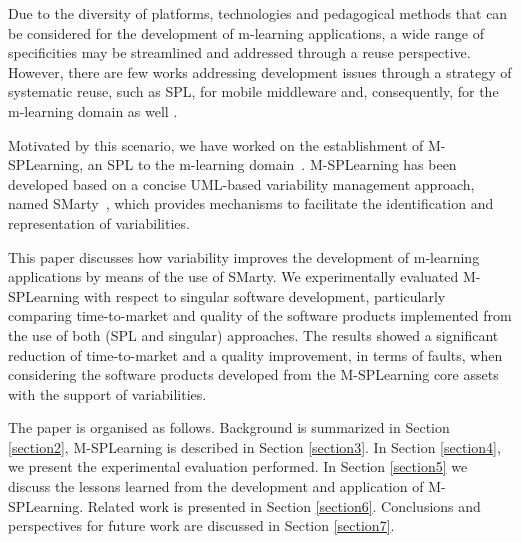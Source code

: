 Due to the diversity of platforms, technologies and pedagogical methods that can be considered for the development of m-learning applications, a wide range of specificities  may be streamlined and addressed through a reuse perspective. However, there are few works addressing development issues through a strategy of systematic reuse, such as SPL, for mobile middleware and, consequently, for the m-learning domain as well \cite{bezerra09}.

Motivated by this scenario, we have worked on the establishment of M-SPLearning, an SPL to the m-learning domain~\cite{falvojr14a, falvojr14b}. M-SPLearning has been developed based on a concise UML-based variability management approach, named SMarty~\cite{oliveirajr10}, which provides mechanisms to facilitate the identification and representation of variabilities.

This paper discusses how variability improves the development of m-learning applications by means of the use of SMarty. We experimentally evaluated M-SPLearning with respect to singular software development, particularly comparing time-to-market and quality of the software products implemented from the use of both (SPL and singular) approaches. The results showed a significant reduction of time-to-market and a quality improvement, in terms of faults, when considering the software products developed from the M-SPLearning core assets with the support of variabilities.

The paper is organised as follows.  Background is summarized in Section \ref{section2}, M-SPLearning is described in Section \ref{section3}. In Section \ref{section4}, we present the experimental evaluation performed. In Section \ref{section5} we discuss the lessons learned from the development and application of M-SPLearning. Related work is presented in Section \ref{section6}. Conclusions and perspectives for future work are discussed in Section \ref{section7}.
